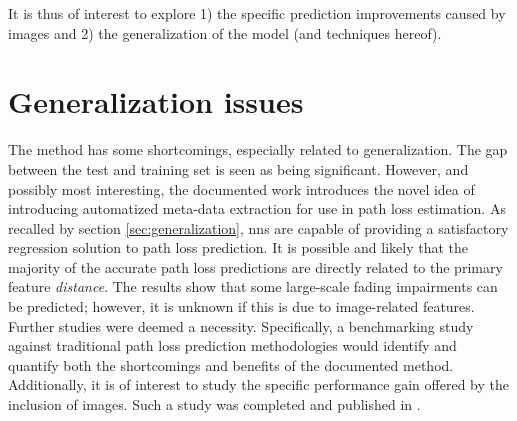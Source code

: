 It is thus of interest to explore 1) the specific prediction improvements caused by images and 2) the generalization of the model (and techniques hereof).

\section{Generalization issues}\label{sec:summary_version1}
The method has some shortcomings, especially related to generalization. The gap between the test and training set is seen as being significant. However, and possibly most interesting, the documented work introduces the novel idea of introducing automatized meta-data extraction for use in path loss estimation.
As recalled by section \ref{sec:generalization}, \glspl{nn} are capable of providing a satisfactory regression solution to path loss prediction. It is possible and likely that the majority of the accurate path loss predictions are directly related to the primary feature \emph{distance}. The results show that some large-scale fading impairments can be predicted; however, it is unknown if this is due to image-related features. Further studies were deemed a necessity. Specifically, a benchmarking study against traditional path loss prediction methodologies would identify and quantify both the shortcomings and benefits of the documented method. Additionally, it is of interest to study the specific performance gain offered by the inclusion of images. Such a study was completed and published in \cite{Thrane020ModelAidedDeepLearning}.  